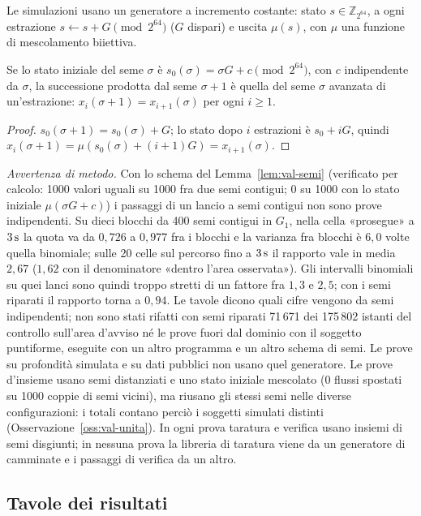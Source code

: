 Le simulazioni usano un generatore a incremento costante: stato $s\in\mathbb Z_{2^{64}}$, a ogni estrazione $s\leftarrow s+G\pmod{2^{64}}$ ($G$ dispari) e uscita $\mu(s)$, con $\mu$ una funzione di mescolamento biiettiva.

\begin{lemma}\label{lem:val-semi}
Se lo stato iniziale del seme $\sigma$ è $s_0(\sigma)=\sigma G+c\pmod{2^{64}}$, con $c$ indipendente da $\sigma$, la successione prodotta dal seme $\sigma+1$ è quella del seme $\sigma$ avanzata di un'estrazione: $x_i(\sigma+1)=x_{i+1}(\sigma)$ per ogni $i\ge1$. 
\end{lemma}
\begin{proof}
$s_0(\sigma+1)=s_0(\sigma)+G$; lo stato dopo $i$ estrazioni è $s_0+iG$, quindi $x_i(\sigma+1)=\mu(s_0(\sigma)+(i+1)G)=x_{i+1}(\sigma)$.
\end{proof}
\emph{Avvertenza di metodo.} Con lo schema del Lemma~\ref{lem:val-semi} (verificato per calcolo: 1000 valori uguali su 1000 fra due semi contigui; 0 su 1000 con lo stato iniziale $\mu(\sigma G+c)$) i passaggi di un lancio a semi contigui non sono prove indipendenti. Su dieci blocchi da 400 semi contigui in $G_1$, nella cella «prosegue» a $3\,\mathrm{s}$ la quota va da $0{,}726$ a $0{,}977$ fra i blocchi e la varianza fra blocchi è $6{,}0$ volte quella binomiale; sulle 20 celle sul percorso fino a $3\,\mathrm{s}$ il rapporto vale in media $2{,}67$ ($1{,}62$ con il denominatore «dentro l'area osservata»). Gli intervalli binomiali su quei lanci sono quindi troppo stretti di un fattore fra $1{,}3$ e $2{,}5$; con i semi riparati il rapporto torna a $0{,}94$. Le tavole dicono quali cifre vengono da semi indipendenti; non sono stati rifatti con semi riparati 71\,671 dei 175\,802 istanti del controllo sull'area d'avviso né le prove fuori dal dominio con il soggetto puntiforme, eseguite con un altro programma e un altro schema di semi. Le prove su profondità simulata e su dati pubblici non usano quel generatore. Le prove d'insieme usano semi distanziati e uno stato iniziale mescolato (0 flussi spostati su 1000 coppie di semi vicini), ma riusano gli stessi semi nelle diverse configurazioni: i totali contano perciò i soggetti simulati distinti (Osservazione~\ref{oss:val-unita}). In ogni prova taratura e verifica usano insiemi di semi disgiunti; in nessuna prova la libreria di taratura viene da un generatore di camminate e i passaggi di verifica da un altro.

\subsection{Tavole dei risultati}\label{sec:val-tavole}


